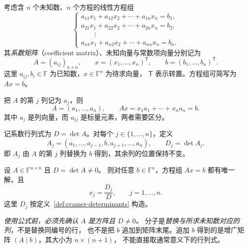 \documentclass[UTF8,12pt,a4paper,fontset=fandol]{ctexart}
\begin{document}
考虑含 $n$ 个未知数、$n$ 个方程的线性方程组
\begin{equation}
  \begin{cases}
    a_{11}x_1+a_{12}x_2+\cdots+a_{1n}x_n=b_1,\\
    a_{21}x_1+a_{22}x_2+\cdots+a_{2n}x_n=b_2,\\
    \qquad\vdots\\
    a_{n1}x_1+a_{n2}x_2+\cdots+a_{nn}x_n=b_n.
  \end{cases}
  \label{eq:cramer-system}
\end{equation}
其\emph{系数矩阵}（coefficient matrix）、未知向量与常数项向量分别记为
\[
  A=(a_{ij})_{n\times n},\qquad
  x=(x_1,\ldots,x_n)^{\mathsf T},\qquad
  b=(b_1,\ldots,b_n)^{\mathsf T}.
\]
这里 $a_{ij},b_i\in\mathbb F$ 为已知数，$x\in\mathbb F^n$ 为待求向量，
$\mathsf T$ 表示转置。方程组可简写为 $Ax=b$。

把 $A$ 的第 $j$ 列记为 $a_j$，则
\begin{equation}
  A=(a_1,\ldots,a_n),\qquad
  Ax=x_1a_1+\cdots+x_na_n=b.
  \label{eq:cramer-column-combination}
\end{equation}
其中 $a_j$ 是列向量，而 $a_{ij}$ 是标量元素，两者需要区分。

\begin{definition}[系数行列式与替换列行列式]
\label{def:cramer-determinants}
记系数行列式为 $D=\det A$。对每个 $j\in\{1,\ldots,n\}$，定义
\begin{equation}
  A_j=(a_1,\ldots,a_{j-1},b,a_{j+1},\ldots,a_n),\qquad
  D_j=\det A_j.
  \label{eq:cramer-replacement}
\end{equation}
即 $A_j$ 由 $A$ 的第 $j$ 列替换为 $b$ 得到，其余列的位置保持不变。
\end{definition}

\begin{theorem}[克拉默法则]
\label{thm:cramer}
设 $A\in\mathbb F^{n\times n}$ 且 $D=\det A\ne0$。
则对任意 $b\in\mathbb F^n$，方程组 $Ax=b$ 都有唯一解，且
\begin{equation}
  x_j=\frac{D_j}{D},\qquad j=1,\ldots,n.
  \label{eq:cramer-formula}
\end{equation}
这里 $D_j$ 按定义~\ref{def:cramer-determinants} 构造。
\end{theorem}

\emph{使用公式前，必须先确认 $A$ 是方阵且 $D\ne0$。}
分子是\emph{替换与所求未知数对应的列}，不是替换同编号的行，
也不是把 $b$ 追加到矩阵末尾。追加 $b$ 得到的是增广矩阵 $(A\mid b)$，其大小为 $n\times(n+1)$，
不能直接取通常意义下的行列式。
\end{document}
